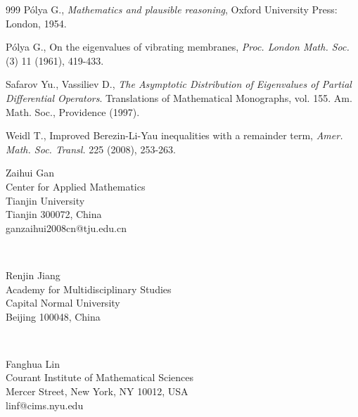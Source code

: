 \documentclass[11pt,twoside, leqno]{article}
\def\rr{{\mathbb R}}
\numberwithin{equation}{section}
\begin{document}
\begin{thebibliography}{999}
\vspace{-0.3cm}
P\'olya G., {\em Mathematics and plausible reasoning},  Oxford University Press: London,
1954.


\vspace{-0.3cm}
 P\'olya G.,
On the eigenvalues of vibrating membranes,
{\em Proc. London Math. Soc.} (3) 11 (1961), 419-433.


\vspace{-0.3cm}
Safarov Yu., Vassiliev D., {\em The Asymptotic Distribution of Eigenvalues of Partial Differential Operators}.
Translations of Mathematical Monographs, vol. 155. Am. Math. Soc., Providence (1997).

%
%
%

\vspace{-0.3cm}
Weidl T.,
Improved Berezin-Li-Yau inequalities with a remainder term, {\em Amer. Math.
Soc. Transl.} 225 (2008), 253-263.




%
\end{thebibliography}
\noindent Zaihui Gan \\
\noindent Center for Applied Mathematics\\
\noindent Tianjin University\\
\noindent Tianjin 300072, China\\
\noindent ganzaihui2008cn@tju.edu.cn

\


\noindent Renjin Jiang \\
\noindent Academy for Multidisciplinary Studies\\
\noindent Capital Normal University\\
\noindent Beijing 100048, China\\

\

\noindent Fanghua Lin\\
\noindent Courant Institute of Mathematical Sciences\\
 Mercer Street, New York, NY 10012, USA \\
\noindent linf@cims.nyu.edu
\end{document}
